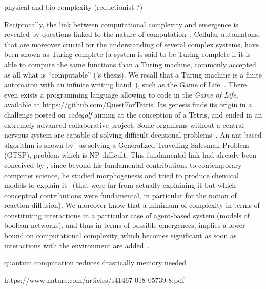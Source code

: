 \cite{WolfE8678} physical and bio complexity (reductionist ?)




Reciprocally, the link between computational complexity and emergence is revealed by questions linked to the nature of computation~\cite{moore2011nature}. Cellular automatons, that are moreover crucial for the understanding of several complex systems, have been shown as Turing-complete (a system is said to be Turing-complete if it is able to compute the same functions than a Turing machine, commonly accepted as all what is ``computable'' ('s thesis). We recall that a Turing machine is a finite automaton with an infinite writing band~\cite{moore2011nature}), such as the Game of Life~\cite{beer2004autopoiesis}. There even exists a programming language allowing to code in the \emph{Game of Life}, available at \url{https://github.com/QuestForTetris}. Its genesis finds its origin in a challenge posted on \emph{codegolf} aiming at the conception of a Tetris, and ended in an extremely advanced collaborative project. Some organisms without a central nervous system are capable of solving difficult decisional problems~\cite{reid2016decision}. An ant-based algorithm is shown by~\cite{Pintea2017} as solving a Generalized Travelling Salesman Problem (GTSP), problem which is NP-difficult. This fundamental link had already been conceived by , since beyond his fundamental contributions to contemporary computer science, he studied morphogenesis and tried to produce chemical models to explain it~\cite{turing1952chemical} (that were far from actually explaining it 
 but which conceptual contributions were fundamental, in particular for the notion of reaction-diffusion). We moreover know that a minimum of complexity in terms of constituting interactions in a particular case of agent-based system (models of boolean networks), and thus in terms of possible emergences, implies a lower bound on computational complexity, which becomes significant as soon as interactions with the environment are added~\cite{tovsic2017boolean}.



\cite{2017arXiv170404231E} quantum computation reduces drastically memory needed

https://www.nature.com/articles/s41467-018-05739-8.pdf



